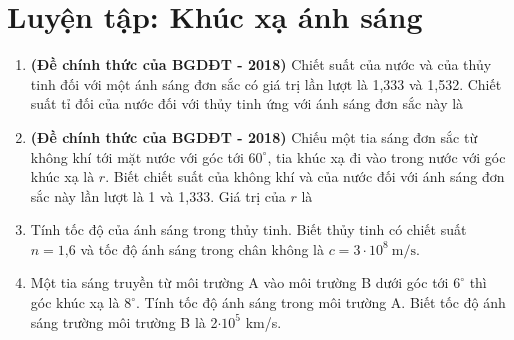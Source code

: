 \chapter{Luyện tập: Khúc xạ ánh sáng}
\begin{enumerate}
	\item {\textbf{(Đề chính thức của BGDĐT - 2018)} Chiết suất của nước và của thủy tinh đối với một ánh sáng đơn sắc có giá trị lần lượt là 1,333 và 1,532. Chiết suất tỉ đối của nước đối với thủy tinh ứng với ánh sáng đơn sắc này là
	}
	\item{\textbf{(Đề chính thức của BGDĐT - 2018)} Chiếu một tia sáng đơn sắc từ không khí tới mặt nước với góc tới $60^\circ$, tia khúc xạ đi vào trong nước với góc khúc xạ là $r$. Biết chiết suất của không khí và của nước đối với ánh sáng đơn sắc này lần lượt là 1 và 1,333. Giá trị của $r$ là
	}
	\item{Tính tốc độ của ánh sáng trong thủy tinh. Biết thủy tinh có chiết suất $n = \text{1,6}$ và tốc độ ánh sáng trong chân không là $c = 3\cdot 10^8\ \text{m/s}$.
	}
	\item {Một tia sáng truyền từ môi trường A vào môi trường B dưới góc tới $6^\circ$ thì góc khúc xạ là $8^\circ$. Tính tốc độ ánh sáng trong môi trường A. Biết tốc độ ánh sáng trường môi trường B là 2$\cdot 10^5$ km/s.
		}
\end{enumerate}
